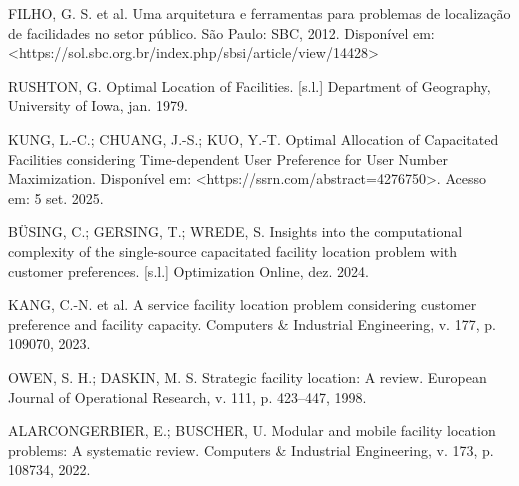 \documentclass[12pt]{article}
\begin{document}
\begin{thebibliography}{99}

 FILHO, G. S. et al. Uma arquitetura e ferramentas para problemas de localização de facilidades no setor público. São Paulo: SBC, 2012. Disponível em: <https://sol.sbc.org.br/index.php/sbsi/article/view/14428>

 RUSHTON, G. Optimal Location of Facilities. [s.l.] Department of Geography, University of Iowa, jan. 1979.

 KUNG, L.-C.; CHUANG, J.-S.; KUO, Y.-T. Optimal Allocation of Capacitated Facilities considering Time-dependent User Preference for User Number Maximization. Disponível em: <https://ssrn.com/abstract=4276750>. Acesso em: 5 set. 2025. 

 BÜSING, C.; GERSING, T.; WREDE, S. Insights into the computational complexity of the single-source capacitated facility location problem with customer preferences. [s.l.] Optimization Online, dez. 2024. 

 KANG, C.-N. et al. A service facility location problem considering customer preference and facility capacity. Computers \& Industrial Engineering, v. 177, p. 109070, 2023.

 OWEN, S. H.; DASKIN, M. S. Strategic facility location: A review. European Journal of Operational Research, v. 111, p. 423–447, 1998. 

 ALARCONGERBIER, E.; BUSCHER, U. Modular and mobile facility location problems: A systematic review. Computers \& Industrial Engineering, v. 173, p. 108734, 2022. 

\end{thebibliography}
\end{document}
